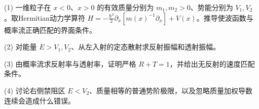 (1) 一维粒子在 \(x<0\)、\(x>0\) 的有效质量分别为 \(m_1,m_2>0\)、势能分别为 \(V_1,V_2\)。取Hermitian动力学算符 \(H=-\frac{\hbar^2}{2}\partial_x[m(x)^{-1}\partial_x]+V(x)\)。推导使波函数与概率流正确匹配的界面条件。

(2) 对能量 \(E>V_1,V_2\)、从左入射的定态散射求反射振幅和透射振幅。

(3) 由概率流求反射率与透射率，证明严格 \(R+T=1\)，并给出无反射的速度匹配条件。

(4) 讨论右侧禁阻区 \(E<V_2\)、质量相等的普通势阶极限，以及忽略质量加权导数连续会造成什么错误。
